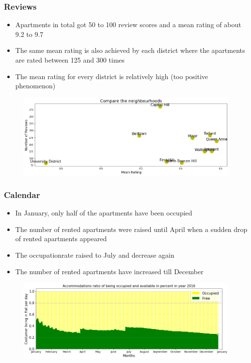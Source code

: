 \documentclass{beamer}
\begin{document}

\begin{frame}
\frametitle{Reviews}
\begin{itemize}
\item Apartments in total got 50 to 100 review scores and a mean rating of about 9.2 to 9.7 
\item The same mean rating is also achieved by each district where the apartments are rated between 125 and 300 times 
\item The mean rating for every district is relatively high (too positive phenomenon)
\end{itemize}
%
\begin{figure}
\includegraphics[width=0.8\linewidth]{photo/2_2_compare_the_neighbourhoods}
\end{figure}
\end{frame}


\begin{frame}
\frametitle{Calendar}
\begin{itemize}
\item In January, only half of the apartments have been occupied
\item The number of rented apartments were raised until April when a sudden drop of rented apartments appeared 
\item The occupationrate raised to July and decrease again
\item The number of rented apartments have increased till December 
\end{itemize}
\begin{figure}
\includegraphics[width=0.8\linewidth]{photo/11_acc_ratio_occupied}
\end{figure}
\end{frame}
\end{document}
